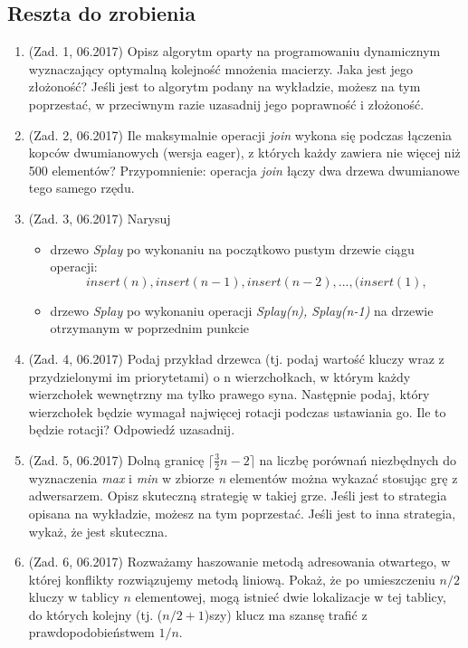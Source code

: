 \documentclass[10pt]{article}%
\begin{document}
\subsection*{Reszta do zrobienia}
\begin{enumerate}

\item(Zad. 1, 06.2017)
Opisz algorytm oparty na programowaniu dynamicznym wyznaczający optymalną kolejność mnożenia macierzy. Jaka jest jego złożoność? Jeśli jest to algorytm podany na wykładzie, możesz na tym poprzestać, w przeciwnym razie uzasadnij jego poprawność i złożoność.


\item (Zad. 2, 06.2017) Ile maksymalnie operacji \textit{join} wykona się podczas łączenia kopców dwumianowych (wersja eager), z których każdy zawiera nie więcej niż 500 elementów? Przypomnienie: operacja \textit{join} łączy dwa drzewa dwumianowe tego samego rzędu.
\item (Zad. 3, 06.2017) Narysuj 
\begin{itemize}
\item drzewo \emph{Splay} po wykonaniu na początkowo pustym drzewie ciągu operacji:
 $$insert(n),insert(n-1),insert(n-2),...,(insert(1),$$
 \item drzewo \emph{Splay} po wykonaniu operacji \emph{Splay(n), Splay(n-1)} na drzewie otrzymanym w poprzednim punkcie
 \end{itemize}

\item(Zad. 4, 06.2017) Podaj przykład drzewca (tj. podaj wartość kluczy wraz z przydzielonymi im priorytetami) o n wierzchołkach, w którym każdy wierzchołek wewnętrzny ma tylko prawego syna. Następnie podaj, który wierzchołek będzie wymagał najwięcej rotacji podczas ustawiania go. Ile to będzie rotacji? Odpowiedź uzasadnij.

\item (Zad. 5, 06.2017) Dolną granicę $\lceil \frac{3}{2} n - 2 \rceil $ na liczbę porównań niezbędnych do wyznaczenia \emph{max} i \emph{min} w zbiorze \emph{n} elementów można wykazać stosując grę z adwersarzem. Opisz skuteczną strategię w takiej grze. Jeśli jest to strategia opisana na wykładzie, możesz na tym poprzestać. Jeśli jest to inna strategia, wykaż, że jest skuteczna.

\item (Zad. 6, 06.2017) Rozważamy haszowanie metodą adresowania otwartego, w której konflikty rozwiązujemy metodą liniową. Pokaż, że po umieszczeniu $n/2$ kluczy w tablicy $n$ elementowej, mogą istnieć dwie lokalizacje w tej tablicy, do których kolejny (tj. ($n/2 + 1$)szy) klucz ma szansę trafić z prawdopodobieństwem $1/n$.


\end{enumerate}
\end{document}
